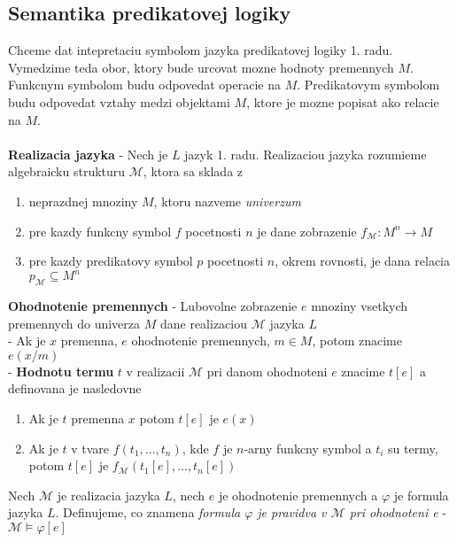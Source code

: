 \documentclass[12pt]{article}
\begin{document}
\subsection{Semantika predikatovej logiky}
Chceme dat intepretaciu symbolom jazyka predikatovej logiky 1. radu. Vymedzime teda obor,
ktory bude urcovat mozne hodnoty premennych $M$. Funkcnym symbolom budu odpovedat operacie na $M$.
Predikatovym symbolom budu odpovedat vztahy medzi objektami $M$, ktore je mozne popisat ako
relacie na $M$. \\
\\
\textbf{Realizacia jazyka} - Nech je $L$ jazyk 1. radu. Realizaciou jazyka rozumieme algebraicku
strukturu $\mathcal{M}$, ktora sa sklada z
\begin{enumerate}
	\item neprazdnej mnoziny $M$, ktoru nazveme \emph{univerzum}
	\item pre kazdy funkcny symbol $f$ pocetnosti $n$ je dane zobrazenie
		$f_{\mathcal{M}}: M^{n} \to M$
	\item pre kazdy predikatovy symbol $p$ pocetnosti $n$, okrem rovnosti, je dana relacia
		$p_{\mathcal{M}} \subseteq M^{n}$
\end{enumerate}
\textbf{Ohodnotenie premennych} - Lubovolne zobrazenie $e$ mnoziny vsetkych premennych do
univerza $M$ dane realizaciou $\mathcal{M}$ jazyka $L$ \\
- Ak je $x$ premenna, $e$ ohodnotenie premennych, $m \in M$, potom znacime $e(x/m)$ \\
- \textbf{Hodnotu termu} $t$ v realizacii $\mathcal{M}$ pri danom ohodnoteni $e$ znacime
	$t[e]$ a definovana je nasledovne
	\begin{enumerate}
		\item Ak je $t$ premenna $x$ potom $t[e]$ je $e(x)$
		\item Ak je $t$ v tvare $f(t_{1},...,t_{n})$, kde $f$ je $n$-arny funkcny symbol
			a $t_{i}$ su termy, potom $t[e]$ je $f_{\mathcal{M}}(t_{1}[e],...,t_{n}[e])$
	\end{enumerate}
\vspace{0.5cm}
Nech $\mathcal{M}$ je realizacia jazyka $L$, nech $e$ je ohodnotenie premennych a $\varphi$
je formula jazyka $L$. Definujeme, co znamena \emph{formula $\varphi$ je pravidva v
$\mathcal{M}$ pri ohodnoteni e} - $\mathcal{M} \models \varphi[e]$
\end{document}

